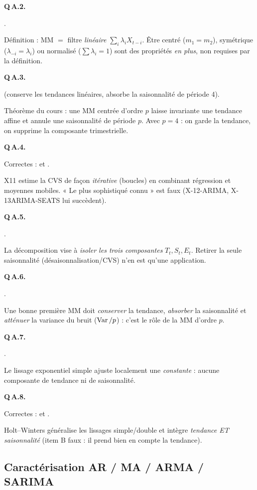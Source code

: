 \documentclass[11pt]{article}
\begin{document}
\textbf{Q\,A.2.} \begin{reponse}.\end{reponse}
Définition : MM $=$ filtre \emph{linéaire} $\sum_i\lambda_iX_{t-i}$. Être centré ($m_1=m_2$),
symétrique ($\lambda_{-i}=\lambda_i$) ou normalisé ($\sum\lambda_i=1$) sont des propriétés
\emph{en plus}, non requises par la définition.

\textbf{Q\,A.3.} \begin{reponse} (conserve les tendances linéaires, absorbe la
saisonnalité de période 4).\end{reponse}
Théorème du cours : une MM centrée d'ordre $p$ laisse invariante une tendance affine et annule
une saisonnalité de période $p$. Avec $p=4$ : on garde la tendance, on supprime la composante
trimestrielle.

\textbf{Q\,A.4.} \begin{reponse}Correctes :  et .\end{reponse}
X11 estime la CVS de façon \emph{itérative} (boucles) en combinant régression et moyennes
mobiles. « Le plus sophistiqué connu » est faux (X-12-ARIMA, X-13ARIMA-SEATS lui succèdent).

\textbf{Q\,A.5.} \begin{reponse}.\end{reponse}
La décomposition vise à \emph{isoler les trois composantes} $T_t,S_t,E_t$. Retirer la seule
saisonnalité (désaisonnalisation/CVS) n'en est qu'une application.

\textbf{Q\,A.6.} \begin{reponse}.\end{reponse}
Une bonne première MM doit \emph{conserver} la tendance, \emph{absorber} la saisonnalité et
\emph{atténuer} la variance du bruit ($\operatorname{Var}/p$) : c'est le rôle de la MM d'ordre $p$.

\textbf{Q\,A.7.} \begin{reponse}.\end{reponse}
Le lissage exponentiel simple ajuste localement une \emph{constante} : aucune composante de
tendance ni de saisonnalité.

\textbf{Q\,A.8.} \begin{reponse}Correctes :  et .\end{reponse}
Holt--Winters généralise les lissages simple/double et intègre \emph{tendance ET saisonnalité}
(item B faux : il prend bien en compte la tendance).

\subsection*{Caractérisation AR / MA / ARMA / SARIMA}
\end{document}
